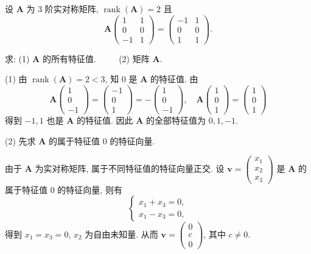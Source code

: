 \documentclass[../../main.tex]{subfiles}%
\begin{document}
\begin{example}
设 $\boldsymbol{A}$ 为 3 阶实对称矩阵, $\operatorname{rank}(\boldsymbol{A}) = 2$ 且
$$
\boldsymbol{A}\begin{pmatrix} 1 & 1 \\ 0 & 0 \\ -1 & 1 \end{pmatrix} = \begin{pmatrix} -1 & 1 \\ 0 & 0 \\ 1 & 1 \end{pmatrix}.
$$

求: (1) $\boldsymbol{A}$ 的所有特征值.
$\quad \quad$
(2) 矩阵 $\boldsymbol{A}$.
\end{example}
\begin{solution}
(1) 由 $\operatorname{rank}(\boldsymbol{A}) = 2 < 3$, 知 $0$ 是 $\boldsymbol{A}$ 的特征值. 由
$$
\boldsymbol{A}\begin{pmatrix} 1 \\ 0 \\ -1 \end{pmatrix} = \begin{pmatrix} -1 \\ 0 \\ 1 \end{pmatrix} = -\begin{pmatrix} 1 \\ 0 \\ -1 \end{pmatrix}, \quad \boldsymbol{A}\begin{pmatrix} 1 \\ 0 \\ 1 \end{pmatrix} = \begin{pmatrix} 1 \\ 0 \\ 1 \end{pmatrix}
$$
得到 $-1, 1$ 也是 $\boldsymbol{A}$ 的特征值. 因此 $\boldsymbol{A}$ 的全部特征值为 $0, 1, -1$.

(2) 先求 $\boldsymbol{A}$ 的属于特征值 $0$ 的特征向量.

由于 $\boldsymbol{A}$ 为实对称矩阵, 属于不同特征值的特征向量正交. 设 $\boldsymbol{v} = \begin{pmatrix} x_1 \\ x_2 \\ x_3 \end{pmatrix}$ 是 $\boldsymbol{A}$ 的属于特征值 $0$ 的特征向量, 则有
$$
\begin{cases}
x_1 + x_3 = 0, \\
x_1 - x_3 = 0,
\end{cases}
$$
得到 $x_1 = x_3 = 0$, $x_2$ 为自由未知量. 从而 $\boldsymbol{v} = \begin{pmatrix} 0 \\ c \\ 0 \end{pmatrix}$, 其中 $c \neq 0$.


\end{solution}
\end{document}
